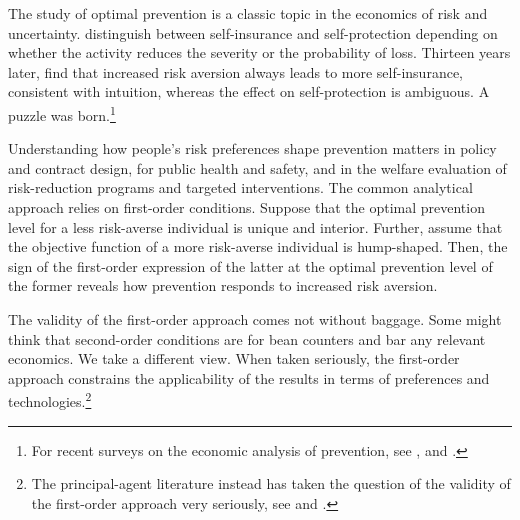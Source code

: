 \documentclass[11pt]{article}
\begin{document}
The study of optimal prevention is a classic topic in the economics of risk and uncertainty. \cite{ehrlich1972market} distinguish between self-insurance and self-protection depending on whether the activity reduces the severity or the probability of loss. Thirteen years later, \cite{dionne1985self} find that increased risk aversion always leads to more self-insurance, consistent with intuition, whereas the effect on self-protection is ambiguous. A puzzle was born.\footnote{For recent surveys on the economic analysis of prevention, see \cite{bleichrodt2022prevention}, \cite{courbage2024prevention} and \cite{peter2024economics,peter2024selfprotection}.}

Understanding how people's risk preferences shape prevention matters in policy and contract design, for public health and safety, and in the  welfare evaluation of risk-reduction programs and targeted interventions. The common analytical approach relies on first-order conditions. Suppose that the optimal prevention level for a less risk-averse individual is unique and interior. Further, assume that the objective function of a more risk-averse individual is hump-shaped. Then, the sign of the first-order expression of the latter at the optimal prevention level of the former reveals how prevention responds to increased risk aversion.


The validity of the first-order approach comes not without baggage. Some might think that second-order conditions are for bean counters and bar any relevant economics. We take a different view. When taken seriously, the first-order approach constrains the applicability of the results in terms of preferences and technologies.\footnote{The principal-agent literature instead has taken the question of the validity of the first-order approach very seriously, see \cite{rogerson1985first} and \cite{jewitt1988justifying}.} 
\end{document}
